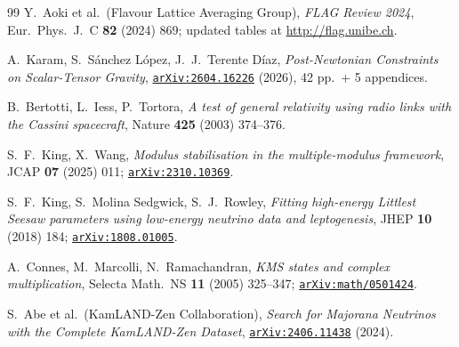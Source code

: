 \documentclass[a4paper,11pt]{article}
\newcommand{\arXiv}[1]{\href{https://arxiv.org/abs/#1}{\texttt{arXiv:#1}}}
\theoremstyle{definition}
\theoremstyle{remark}
\begin{document}
\begin{thebibliography}{99}
Y.~Aoki et al.\ (Flavour Lattice Averaging Group),
\emph{FLAG Review 2024},
Eur.~Phys.~J.~C \textbf{82} (2024) 869; updated tables
at \url{http://flag.unibe.ch}.


A.~Karam, S.~S\'anchez L\'opez, J.~J.~Terente D\'iaz,
\emph{Post-Newtonian Constraints on Scalar-Tensor Gravity},
\arXiv{2604.16226} (2026), 42 pp.\ + 5 appendices.

B.~Bertotti, L.~Iess, P.~Tortora,
\emph{A test of general relativity using radio links with the Cassini
spacecraft},
Nature \textbf{425} (2003) 374--376.

S.~F.~King, X.~Wang,
\emph{Modulus stabilisation in the multiple-modulus framework},
JCAP \textbf{07} (2025) 011;
\arXiv{2310.10369}.

S.~F.~King, S.~Molina Sedgwick, S.~J.~Rowley,
\emph{Fitting high-energy Littlest Seesaw parameters using low-energy
neutrino data and leptogenesis},
JHEP \textbf{10} (2018) 184;
\arXiv{1808.01005}.

A.~Connes, M.~Marcolli, N.~Ramachandran,
\emph{KMS states and complex multiplication},
Selecta Math.\ NS \textbf{11} (2005) 325--347;
\arXiv{math/0501424}.

S.~Abe et al.\ (KamLAND-Zen Collaboration),
\emph{Search for Majorana Neutrinos with the Complete KamLAND-Zen
Dataset},
\arXiv{2406.11438} (2024).


\end{thebibliography}
\end{document}
